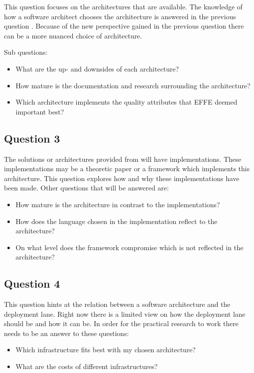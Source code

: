 This question focuses on the architectures that are available. The knowledge of how a software architect chooses the architecture is answered in the previous question . Because of the new perspective gained in the previous question there can be a more nuanced choice of architecture.

Sub questions:
\begin{itemize}
	\item What are the up- and downsides of each architecture?
	\item How mature is the documentation and research surrounding the architecture?
	\item Which architecture implements the quality attributes that EFFE deemed important best?
\end{itemize}

\subsection{Question 3}

The solutions or architectures provided from  will have implementations. These implementations may be a theoretic paper or a framework which implements this architecture. This question explores how and why these implementations have been made. Other questions that will be answered are:
\begin{itemize}
	\item How mature is the architecture in contrast to the implementations?
	\item How does the language chosen in the implementation reflect to the architecture?
	\item On what level does the framework compromise which is not reflected in the architecture?
\end{itemize}

\subsection{Question 4}


This question hints at the relation between a software architecture and the deployment lane. Right now there is a limited view on how the deployment lane should be and how it can be. In order for the practical research to work there needs to be an answer to these questions:
\begin{itemize}
	\item Which infrastructure fits best with my chosen architecture?
	\item What are the costs of different infrastructures?
\end{itemize}

